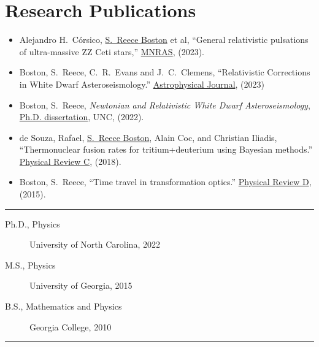 \documentclass[11pt, letter]{article}
\begin{document}
\vspace{-0.5\baselineskip}
\section*{Research Publications}
\begin{minipage}{\textwidth}
%
\begin{itemize}
		\item Alejandro H.~C\'orsico, \underline{S.~Reece Boston} et al, 
			``General relativistic pulsations of ultra-massive ZZ Ceti stars,'' 
			\href{https://doi.org/10.1093/mnras/stad2248}{MNRAS}, 
			(2023).
		\item Boston, S.~Reece, C.~R.~Evans and J.~C.~Clemens, 
			``Relativistic Corrections in White Dwarf Asteroseismology.'' 
			\href{https://iopscience.iop.org/article/10.3847/1538-4357/acd446}{Astrophysical Journal}, (2023)
		\item Boston, S.~Reece, 
			\emph{Newtonian and Relativistic White Dwarf Asteroseismology}, 
			\\\href{https://cdr.lib.unc.edu/concern/dissertations/jw827n44n?locale=en}{Ph.D. dissertation}, 
			UNC, (2022).
		\item de Souza, Rafael, \underline{S.~Reece Boston}, Alain Coc, and Christian Iliadis, 
			``Thermonuclear fusion rates for tritium+deuterium using Bayesian methods.''  
			\href{http://journals.aps.org/prc/abstract/10.1103/PhysRevC.99.014619}{Physical Review C}, 
			(2018).
		\item Boston, S.~Reece, 
			``Time travel in transformation optics.''  
			\href{http://journals.aps.org/prd/abstract/10.1103/PhysRevD.91.124035}{Physical Review D}, 
			(2015).
\end{itemize}

\hrule
\end{minipage}
\begin{description}
		\item[Ph.D., Physics] University of North Carolina, 2022
		\item[M.S., Physics] University of Georgia, 2015
		\item[B.S., Mathematics and Physics] Georgia College, 2010
\end{description}
\hrule

\vfill
\mbox{}
\end{document}
